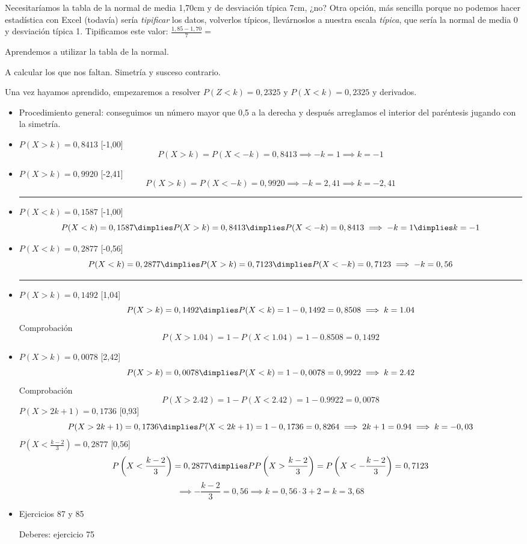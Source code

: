 Necesitaríamos la tabla de la normal de media 1,70cm y de desviación típica 7cm, ¿no? Otra opción, más sencilla porque no podemos hacer estadística con Excel (todavía) sería \textit{tipificar} los datos, volverlos típicos, llevárnoslos a nuestra escala \textit{típica}, que sería la normal de media 0 y desviación típica 1. Tipificamos este valor: $\frac{1,85-1,70}{7} = $

Aprendemos a utilizar la tabla de la normal. 

A calcular los que nos faltan. Simetría y susceso contrario.

Una vez hayamos aprendido, empezaremos a resolver $P(Z<k) = 0,2325$ y $P(X<k) = 0,2325$ y derivados.


\begin{itemize}
	\item Procedimiento general: conseguimos un número mayor que 0,5 a la derecha y después arreglamos el interior del paréntesis jugando con la simetría.
	\item $P(X>k) = 0,8413$ [-1,00]
	\[P(X>k) = P(X<-k) = 0,8413 \implies -k = 1 \implies k=-1\]
	\item $P(X>k) = 0,9920$ [-2,41]
	\[P(X>k) = P(X<-k) = 0,9920 \implies -k = 2,41 \implies k=-2,41\]
	\hrule{}
	\item $P(X<k) = 0,1587$ [-1,00]
	\[P(X<k) = 0,1587 \dimplies P(X>k) = 0,8413 \dimplies P(X<-k) = 0,8413 \implies -k = 1 \dimplies k=-1\]
	\item $P(X<k) = 0,2877$ [-0,56]
	\[P(X<k) = 0,2877 \dimplies P(X>k) = 0,7123 \dimplies P(X<-k) = 0,7123 \implies -k = 0,56\]
	\hrule{}
	\item $P(X>k) = 0,1492$ [1,04]
	\[ P(X>k) = 0,1492 \dimplies P(X<k) = 1-0,1492 = 0,8508 \implies k=1.04\]
	Comprobación \[P(X>1.04) = 1-P(X<1.04) = 1- 0.8508 = 0,1492\]
	\item $P(X>k) = 0,0078$ [2,42]
	\[ P(X>k) = 0,0078 \dimplies P(X<k) = 1-0,0078 = 0,9922 \implies k=2.42\]
	Comprobación \[P(X>2.42) = 1-P(X<2.42) = 1- 0.9922 = 0,0078\]
	\subitem $P(X>2k+1) = 0,1736$ [0,93]
	\[ P(X>2k+1) = 0,1736 \dimplies P(X<2k+1) = 1-0,1736 = 0,8264 \implies 2k+1=0.94 \implies k=-0,03\]
	\subitem $P\left(X<\frac{k-2}{3}\right) = 0,2877$ [0,56]
	\[ P\left(X<\frac{k-2}{3}\right) = 0,2877 \dimplies PP\left(X>\frac{k-2}{3}\right) = P\left(X<-\frac{k-2}{3}\right) = 0,7123\]
	\[ \implies -\frac{k-2}{3} = 0,56 \implies k=0,56·3+2 = k=3,68\]

	\item Ejercicios 87 y 85

	Deberes: ejercicio 75

\end{itemize}

